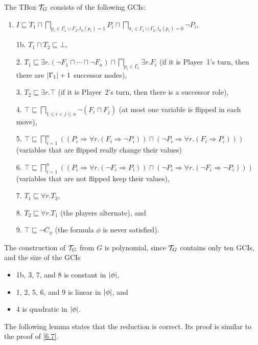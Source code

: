 \documentclass[openany]{scrbook}
\theoremstyle{break}
\theoremstyle{nonumberbreak}
\theoremstyle{nonumberplain}
\theoremstyle{nonumberbreak}
\newcommand{\then}{\Longrightarrow}
\newcommand{\abs}[2][]{\left|{#2}\right|\ifx#1\then\else_{#1}\fi}
\begin{document}
The TBox ${\cal T}_G$ consists of the following GCIs:
\begin{enumerate}
\item $I \sqsubseteq T_1 \sqcap \bigsqcap_{p_i \in \Gamma_1 \cup
    \Gamma_2, t_0(p_i) = 1}{P_i} \sqcap \bigsqcap_{\pi_i \in \Gamma_1 \cup
    \Gamma_2, t_0(p_i) = 0}{\neg P_i}$,
\item[1b.] $T_1 \sqcap T_2 \sqsubseteq \bot$,
\item[2.] $T_1 \sqsubseteq \exists r.(\neg F_1 \sqcap \dotsb \sqcap
  \neg F_n) \sqcap \bigsqcap_{p_i \in \Gamma_1}{\exists r. F_i}$ (if
  it is Player~1's turn, then there are $\abs{\Gamma_1} + 1$ successor
  nodes),
\item[3.] $T_2 \sqsubseteq \exists r.\top$ (if it is Player~2's turn,
  then there is a successor role),
\item[4.] $\top \sqsubseteq \bigsqcap_{1 \leq i < j \leq n}{\neg (F_i
    \sqcap F_j)}$ (at most one variable is flipped in each move),
\item[5.] $\top \sqsubseteq \bigsqcap_{i = 1}^n \left(\left(P_i \then
      \forall r.(F_i \then \neg P_i)\right) \sqcap
    \left(\neg P_i \then \forall r.(F_i \then P_i)\right)\right)$
  (variables that are flipped really change their values)
\item[6.] $\top \sqsubseteq \bigsqcap_{i = 1}^n \left(\left(P_i \then
      \forall r.(\neg F_i \then P_i)\right) \sqcap \left(\neg P_i
      \then \forall r.(\neg F_i \then \neg P_i)\right)\right)$
  (variables that are not flipped keep their values),
\item[7.] $T_1 \sqsubseteq \forall r.T_2$,
\item[8.] $T_2 \sqsubseteq \forall r.T_1$ (the players alternate), and
\item[9.]$\top \sqsubseteq \neg C_{\phi}$ (the formula $\phi$ is never
  satisfied).
\end{enumerate}

The construction of ${\cal T}_G$ from $G$ is polynomial, since ${\cal
  T}_G$ contains only ten GCIs, and the size of the GCIs
\begin{itemize}
\item 1b, 3, 7, and 8 is constant in $\abs{\phi}$,
\item 1, 2, 5, 6, and 9 is linear in $\abs{\phi}$, and
\item 4 is quadratic in $\abs{\phi}$.
\end{itemize}

The following lemma states that the reduction is correct. Its proof is
similar to the proof of \cref{6.7}.
\end{document}
